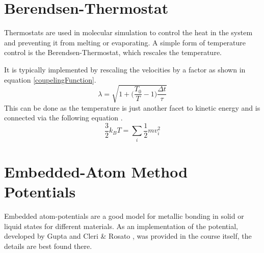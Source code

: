 \section{Berendsen-Thermostat}
\begin{comment}
- couple the moleclular system to a larger heat bath
- thermostat controls the heat of the simulation so the system does not melt or evaporate
\end{comment}
Thermostats are used in molecular simulation to control the heat in the system and preventing it from melting or evaporating. A simple form of temperature control is the Berendsen-Thermostat, which rescales the temperature. 
\par
It is typically implemented by rescaling the velocities by a factor as shown in equation \ref{coupelingFunction}. 
\begin{equation}
	\label{coupelingFunction}
	\lambda = \sqrt{1 + \bigg(\frac{T_{0}}{T} -1\bigg)\frac{\Delta t}{\tau}}
\end{equation}
This can be done as the temperature is just another facet to kinetic energy and is connected via the following equation \cite[cf.][]{molDymCourse}. 
\begin{equation}
	\label{bolzmann}
	\frac{3}{2} k_{B} T = \sum_{i} \frac{1}{2} m v_{i}^2
\end{equation}

\section{Embedded-Atom Method Potentials}
\begin{comment}
- describe Units 
- better discribed in the course
- good model for metalic systems
- work with gold clusters 

\end{comment}
Embedded atom-potentials are a good model for metallic bonding in solid or liquid states for different materials. As an implementation of the potential, developed by Gupta \cite{gupta} and Cleri \& Rosato \cite{rosato}, was provided in the course \cite{molDymCourse} itself, the details are best found there.


